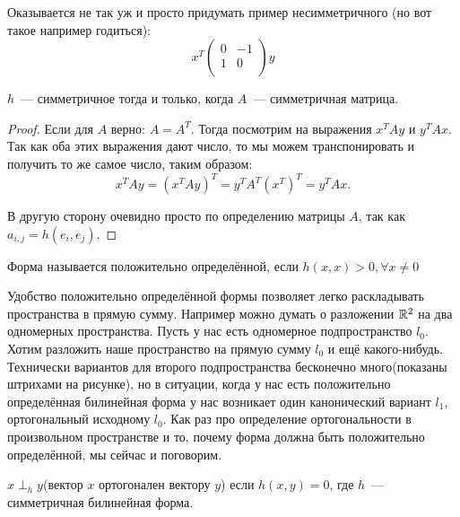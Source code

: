 \begin{remark}
    Оказывается не так уж и просто придумать пример несимметричного
    (но вот такое например годиться):
    \[
        x^T
        \begin{pmatrix}
            0 & -1\\
            1 & 0\\
        \end{pmatrix} y
    \]
\end{remark}
\begin{remark}
    $h$~--- симметричное тогда и только, когда $A$~--- симметричная матрица.
\end{remark}
\begin{proof}
    Если для $A$ верно: $A = A^T$. Тогда посмотрим на выражения $x^T A y$ и $y^T A x$.
    Так как оба этих выражения дают число, то мы можем транспонировать и получить то же 
    самое число, таким образом: 
    \[
        x^T A y = (x^T A y)^T = y^T A^T (x^T)^T = y^T A x
    .\]

    В другую сторону очевидно просто по определению матрицы $A$, так как $a_{i,j} = h(e_i, e_j)$.
\end{proof}
\begin{definition}
    Форма называется положительно определённой, если $h(x, x) > 0, \forall x\not=0$
\end{definition}
\begin{remark}
    Удобство положительно определённой формы позволяет легко раскладывать пространства в прямую сумму.
    Например можно думать о разложении  $\mathbb{R}^2$ на два одномерных пространства. Пусть у нас есть
    одномерное подпространство $l_0$. Хотим разложить наше пространство на прямую сумму $l_0$
    и ещё какого-нибудь. Технически вариантов для второго подпространства бесконечно много(показаны
    штрихами на рисунке), но в ситуации, когда у нас есть положительно определённая билинейная
    форма у нас возникает один канонический вариант $l_1$, ортогональный исходному $l_0$. Как раз
    про определение ортогональности в произвольном пространстве и то, почему 
    форма должна быть положительно определённой, мы сейчас и поговорим.
    \begin{figure}[H]
        \centering
        \label{fig:12.1}
    \end{figure}
\end{remark}
\begin{definition}
    $x \perp_h y$(вектор $x$ ортогонален вектору $y$) если $h(x,y) = 0$, где $h$~--- симметричная 
    билинейная форма.
\end{definition}
